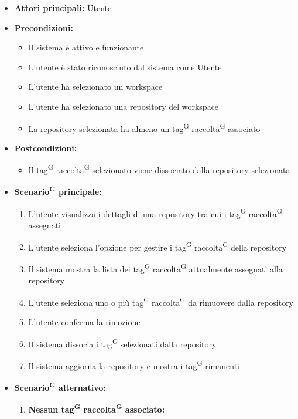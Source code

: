 \documentclass[a4paper, 11pt]{article}
\begin{document}
\begin{itemize}
	\item \textbf{Attori principali:} Utente
	\item \textbf{Precondizioni:} 
	\begin{itemize}
		\item Il sistema è attivo e funzionante
		\item L'utente è stato riconosciuto dal sistema come Utente
		\item L'utente ha selezionato un workspace
		\item L'utente ha selezionato una repository del workspace
		\item La repository selezionata ha almeno un tag\textsuperscript{G} raccolta\textsuperscript{G} associato
	\end{itemize}
	\item \textbf{Postcondizioni:} 
	\begin{itemize}
		\item Il tag\textsuperscript{G} raccolta\textsuperscript{G} selezionato viene dissociato dalla repository selezionata
	\end{itemize}
	\item \textbf{Scenario\textsuperscript{G} principale:}
	\begin{enumerate}
		\item L'utente visualizza i dettagli di una repository tra cui i tag\textsuperscript{G} raccolta\textsuperscript{G} assegnati
		\item L'utente seleziona l'opzione per gestire i tag\textsuperscript{G} raccolta\textsuperscript{G} della repository
		\item Il sistema mostra la lista dei tag\textsuperscript{G} raccolta\textsuperscript{G} attualmente assegnati alla repository
		\item L'utente seleziona uno o più tag\textsuperscript{G} raccolta\textsuperscript{G} da rimuovere dalla repository
		\item L'utente conferma la rimozione
		\item Il sistema dissocia i tag\textsuperscript{G} selezionati dalla repository
		\item Il sistema aggiorna la repository e mostra i tag\textsuperscript{G} rimanenti
	\end{enumerate}
		\item \textbf{Scenario\textsuperscript{G} alternativo:}
	\begin{enumerate}
		\item \textbf{Nessun tag\textsuperscript{G} raccolta\textsuperscript{G} associato:} 

\end{enumerate}
\end{itemize}
\end{document}
